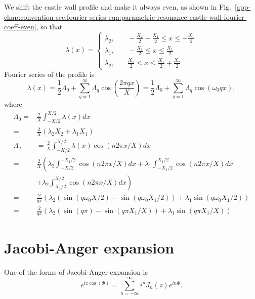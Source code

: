 We shift the castle wall profile and make it always even, as shown in Fig.~\ref{app-chap:convention-sec:fourier-series-eqn:parametric-resonance-castle-wall-fourier-coeff-even}, so that
\begin{equation}
   \lambda(x) = \begin{cases} \lambda_2 , &\quad -\frac{X_2}{2}-\frac{X_1}{2}\le x\le -\frac{X_1}{2} \\
   \lambda_1, &\quad -\frac{X_1}{2}\le x\le \frac{X_1}{2} \\
   \lambda_2, &\quad \frac{X_1}{2}\le x\le \frac{X_1}{2}+\frac{X_2}{2}
   \end{cases}
\end{equation}
Fourier series of the profile is
\begin{equation}
   \lambda(x) = \frac{1}{2}\Lambda_0 + \sum_{q=1}^{\infty} \Lambda_q \cos\left( \frac{ 2\pi q x}{X} \right) = \frac{1}{2} \Lambda_0 + \sum_{q=1}^{\infty} \Lambda_q \cos\left( \omega_0 q x \right),
\end{equation}
where
\begin{align}
   \Lambda_0 =& \frac{2}{X} \int^{X/2}_{-X/2} \lambda(x) d x \\
    =& \frac{2}{X} \left(  \lambda_2 X_2 + \lambda_1 X_1   \right) \\
   \Lambda_q &= \frac{2}{X} \int_{-X/2}^{X/2} \lambda(x) \cos(n 2\pi x/X)dx \\
    =& \frac{2}{X} \left( \lambda_2 \int_{-X/2}^{-X_1/2} \cos(n 2\pi x/X)dx + \lambda_1 \int_{-X_1/2}^{X_1/2} \cos(n 2\pi x/X)dx \right. \\
   &\left.+ \lambda_2 \int_{X_1/2}^{X/2} \cos(n 2\pi x/X)dx \right) \\
    =& \frac{2}{q\pi} \left( \lambda_2\left( \sin(q\omega_0 X/2) - \sin(q\omega_0 X_1/2) \right) + \lambda_1 \sin( q\omega_0 X_1/2)  \right)  \\
    =& \frac{2}{q\pi} \left( \lambda_2\left( \sin(q \pi ) - \sin(q \pi X_1/X) \right) + \lambda_1 \sin( q\pi X_1/X)  \right)
\end{align}


\section{Jacobi-Anger expansion}

One of the forms of Jacobi-Anger expansion is
\begin{equation}
    e^{i z \cos (\Phi)} = \sum_{n=-\infty}^\infty i^n J_n(z) e^{i n\Phi}.
    \label{eqn:jacobi-anger-expansion}
\end{equation}
      

